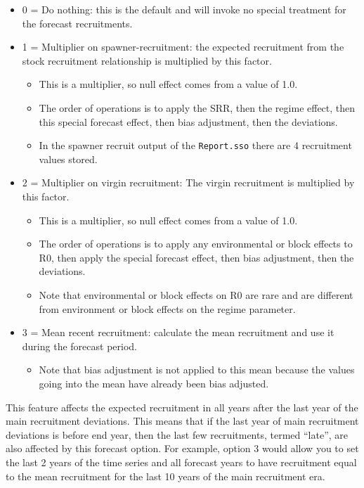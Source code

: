 \begin{itemize}
	\item 0 = Do nothing: this is the default and will invoke no special treatment for the forecast recruitments.
	\item 1 = Multiplier on spawner-recruitment: the expected recruitment from the stock recruitment relationship is multiplied by this factor.
	\begin{itemize}
		\item This is a multiplier, so null effect comes from a value of 1.0.
		\item The order of operations is to apply the SRR, then the regime effect, then this special forecast effect, then bias adjustment, then the deviations.
		\item In the spawner recruit output of the \texttt{Report.sso} there are 4 recruitment values stored.
	\end{itemize}
	\item 2 = Multiplier on virgin recruitment: The virgin recruitment is multiplied by this factor.
	\begin{itemize}
		\item This is a multiplier, so null effect comes from a value of 1.0.
		\item The order of operations is to apply any environmental or block effects to R0, then apply the special forecast effect, then bias adjustment, then the deviations.
		\item Note that environmental or block effects on R0 are rare and are different from environment or block effects on the regime parameter.
	\end{itemize}
	\item 3 = Mean recent recruitment: calculate the mean recruitment and use it during the forecast period.
	\begin{itemize}
		\item Note that bias adjustment is not applied to this mean because the values going into the mean have already been bias adjusted.
	\end{itemize}
\end{itemize}

This feature affects the expected recruitment in all years after the last year of the main recruitment deviations. This means that if the last year of main recruitment deviations is before end year, then the last few recruitments, termed ``late'', are also affected by this forecast option. For example, option 3 would allow you to set the last 2 years of the time series and all forecast years to have recruitment equal to the mean recruitment for the last 10 years of the main recruitment era.

\pagebreak

